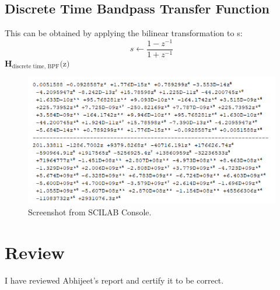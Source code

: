 \documentclass[12pt]{article}
\begin{document}
\subsection{Discrete Time Bandpass Transfer Function}
This can be obtained by applying the bilinear transformation to s:
\[s \leftarrow \frac{1 - z^{-1}}{1 + z^{-1}}\]
\textbf{H$_{\text{discrete time, BPF}}\text{(z)}$}
\begin{figure}[h]
    \centering
    \includegraphics[width=\textwidth]{h_discrete_time_bandpass.png}
    \caption{Screenshot from SCILAB Console.}
\end{figure}

\section{Review}
I have reviewed Abhijeet's report and certify it to be correct.
\end{document}
